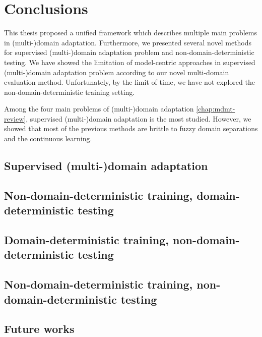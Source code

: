 \chapter{Conclusions}
\label{chap:conclusion}
This thesis proposed a unified framework which describes multiple main problems in (multi-)domain adaptation. Furthermore, we presented several novel methods for supervised (multi-)domain adaptation problem and non-domain-deterministic testing. We have showed the limitation of model-centric approaches in 
supervised (multi-)domain adaptation problem according to our novel multi-domain evaluation method. Unfortunately, by the limit of time, we have not explored the non-domain-deterministic training setting.

Among the four main problems of (multi-)domain adaptation \ref{chap:mdmt-review}, supervised (multi-)domain adaptation is the most studied. However, we showed that most of the previous methods are brittle to fuzzy domain separations and the continuous learning.  

\section{Supervised (multi-)domain adaptation}

\section{Non-domain-deterministic training, domain-deterministic testing}

\section{Domain-deterministic training, non-domain-deterministic testing}

\section{Non-domain-deterministic training, non-domain-deterministic testing}

\section{Future works}
